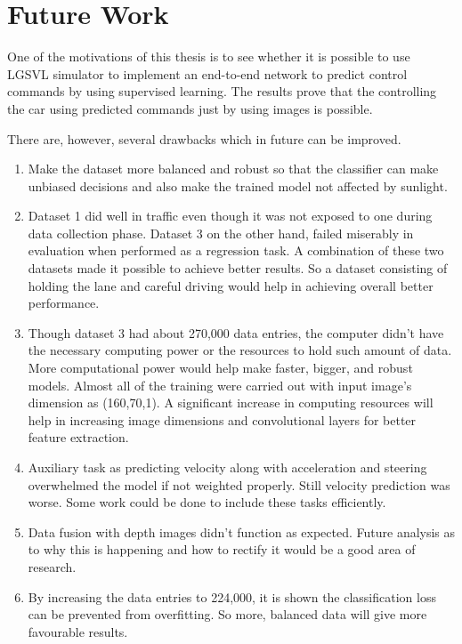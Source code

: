 \chapter{Future Work}
One of the motivations of this thesis is to see whether it is possible to use LGSVL
simulator to implement an end-to-end network to predict control commands by using
supervised learning. The results prove that the controlling the car using predicted
commands just by using images is possible. 

There are, however, several drawbacks which in future can be improved.
\begin{enumerate}
    \item Make the dataset more balanced and robust so that the classifier can make unbiased
        decisions and also make the trained model not affected by sunlight.
    \item Dataset 1 did well in traffic even though it was not exposed to one during data
        collection phase. Dataset 3 on the other hand, failed miserably in evaluation when
        performed as a regression task. A combination of these two datasets made it
        possible to achieve better results. So a dataset consisting of holding the lane
        and careful driving would help in achieving overall better performance.
    \item Though dataset 3 had about 270,000 data entries, the computer didn't have the
        necessary computing power or the resources to hold such amount of data. More
        computational power would help make faster, bigger, and robust models.  Almost all of the training were carried out with input image's dimension as (160,70,1). A significant increase in computing resources will help in increasing image dimensions and convolutional layers for better feature extraction.
    \item Auxiliary task as predicting velocity along with acceleration and steering
        overwhelmed the model if not weighted properly. Still velocity prediction was
        worse. Some work could be done to include these tasks efficiently.
    \item Data fusion with depth images didn't function as expected. Future analysis as to why this is happening and how to rectify it would be a good area of research.
    \item By increasing the data entries to 224,000, it is shown the classification loss can be prevented from overfitting. So more, balanced data will give more favourable results.
\end{enumerate}

